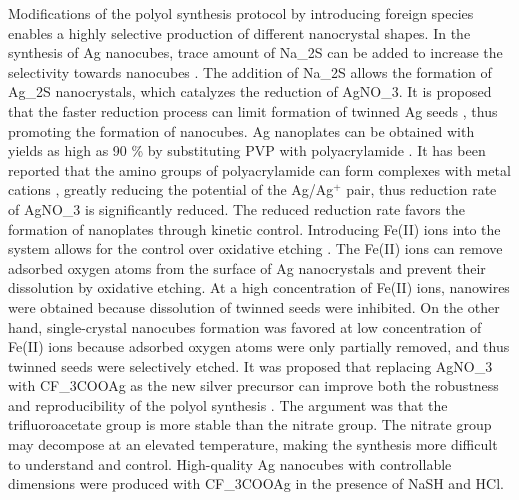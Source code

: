 Modifications of the polyol synthesis protocol by introducing foreign species enables a highly selective production of different nanocrystal shapes.
In the synthesis of Ag nanocubes, trace amount of Na_2S can be added to increase the selectivity towards nanocubes \cite{Skrabalak_2007,Siekkinen_2006}.
The addition of Na_2S allows the formation of Ag_2S nanocrystals, which catalyzes the reduction of AgNO_3.
It is proposed that the faster reduction process can limit formation of twinned Ag seeds \cite{Wiley_2006}, thus promoting the formation of nanocubes.
Ag nanoplates can be obtained with yields as high as 90 \% by substituting PVP with polyacrylamide \cite{Xiong_2007}.
It has been reported that the amino groups of polyacrylamide can form complexes with metal cations \cite{Sari_2006}, greatly reducing the potential of the Ag/Ag$^+$ pair, thus reduction rate of AgNO_3 is significantly reduced.
The reduced reduction rate favors the formation of nanoplates through kinetic control.
Introducing Fe(II) ions into the system allows for the control over oxidative etching \cite{Wiley_2005}.
The Fe(II) ions can remove adsorbed oxygen atoms from the surface of Ag nanocrystals and prevent their dissolution by oxidative etching.
At a high concentration of Fe(II) ions, nanowires were obtained because dissolution of twinned seeds were inhibited.
On the other hand, single-crystal nanocubes formation was favored at low concentration of Fe(II) ions because adsorbed oxygen atoms were only partially removed, and thus twinned seeds were selectively etched.
It was proposed that replacing AgNO_3 with CF_3COOAg as the new silver precursor can improve both the robustness and reproducibility of the polyol synthesis \cite{Zhang_2010}.
The argument was that the trifluoroacetate group is more stable than the nitrate group.
The nitrate group may decompose at an elevated temperature, making the synthesis more difficult to understand and control.
High-quality Ag nanocubes with controllable dimensions were produced with CF_3COOAg in the presence of NaSH and HCl.


